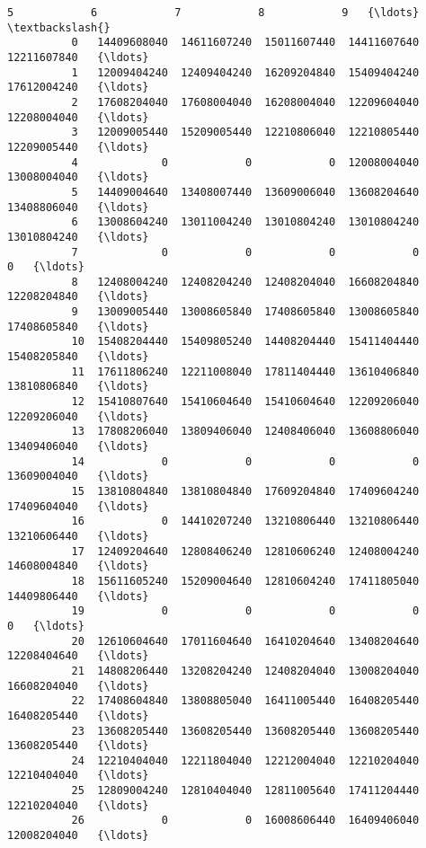 \documentclass[11pt]{article}
\begin{document}
\begin{Verbatim}[commandchars=\\\{\}]
                        5            6            7            8            9   {\ldots}     \textbackslash{}
          0   14409608040  14611607240  15011607440  14411607640  12211607840   {\ldots}      
          1   12009404240  12409404240  16209204840  15409404240  17612004240   {\ldots}      
          2   17608204040  17608004040  16208004040  12209604040  12208004040   {\ldots}      
          3   12009005440  15209005440  12210806040  12210805440  12209005440   {\ldots}      
          4             0            0            0  12008004040  13008004040   {\ldots}      
          5   14409004640  13408007440  13609006040  13608204640  13408806040   {\ldots}      
          6   13008604240  13011004240  13010804240  13010804240  13010804240   {\ldots}      
          7             0            0            0            0            0   {\ldots}      
          8   12408004240  12408204240  12408204040  16608204840  12208204840   {\ldots}      
          9   13009005440  13008605840  17408605840  13008605840  17408605840   {\ldots}      
          10  15408204440  15409805240  14408204440  15411404440  15408205840   {\ldots}      
          11  17611806240  12211008040  17811404440  13610406840  13810806840   {\ldots}      
          12  15410807640  15410604640  15410604640  12209206040  12209206040   {\ldots}      
          13  17808206040  13809406040  12408406040  13608806040  13409406040   {\ldots}      
          14            0            0            0            0  13609004040   {\ldots}      
          15  13810804840  13810804840  17609204840  17409604240  17409604040   {\ldots}      
          16            0  14410207240  13210806440  13210806440  13210606440   {\ldots}      
          17  12409204640  12808406240  12810606240  12408004240  14608004840   {\ldots}      
          18  15611605240  15209004640  12810604240  17411805040  14409806440   {\ldots}      
          19            0            0            0            0            0   {\ldots}      
          20  12610604640  17011604640  16410204640  13408204640  12208404640   {\ldots}      
          21  14808206440  13208204240  12408204040  13008204040  16608204040   {\ldots}      
          22  17408604840  13808805040  16411005440  16408205440  16408205440   {\ldots}      
          23  13608205440  13608205440  13608205440  13608205440  13608205440   {\ldots}      
          24  12210404040  12211804040  12212004040  12210204040  12210404040   {\ldots}      
          25  12809004240  12810404040  12811005640  17411204440  12210204040   {\ldots}      
          26            0            0  16008606440  16409406040  12008204040   {\ldots}      

\end{Verbatim}
\end{document}
